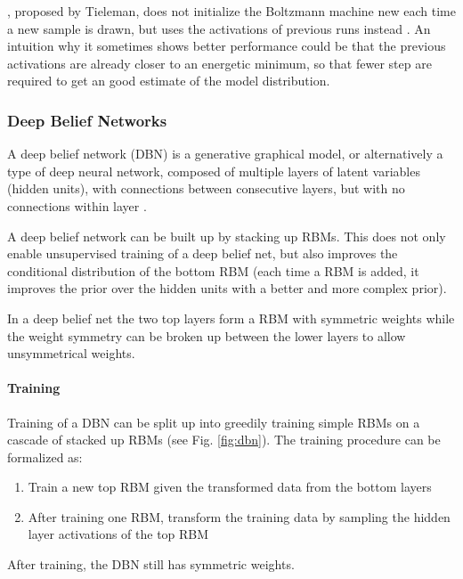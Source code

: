 , proposed by Tieleman, does not initialize the Boltzmann machine new each time a new sample is drawn, but uses the activations of previous runs instead \cite{tieleman2008training}. An intuition why it sometimes shows better performance could be that the previous activations are already closer to an energetic minimum, so that fewer step are required to get an good estimate of the model distribution. 


\subsubsection{Deep Belief Networks}

A deep belief network (DBN) is a generative graphical model, or alternatively a type of deep neural network, composed of multiple layers of latent variables (hidden units), with connections between consecutive layers, but with no connections within layer \cite{hinton2006fast} \cite{hinton2009deep} \cite{Goodfellow-et-al-2016-Book}.

A deep belief network can be built up by stacking up RBMs.
This does not only enable unsupervised training of a deep belief net, but also improves the conditional distribution of the bottom RBM (each time a RBM is added, it improves the prior over the hidden units with a better and more complex prior).

In a deep belief net the two top layers form a RBM with symmetric weights while the weight symmetry can be broken up between the lower layers to allow unsymmetrical weights.   

\paragraph{Training} 

Training of a DBN can be split up into greedily training simple RBMs on a cascade of stacked up RBMs (see Fig. \ref{fig:dbn}).
The training procedure can be formalized as:  
\begin{enumerate}
\item Train a new top RBM given the transformed data from the bottom layers
\item After training one RBM, transform the training data by sampling the hidden layer activations of the top RBM
\end{enumerate}

After training, the DBN still has symmetric weights. 

